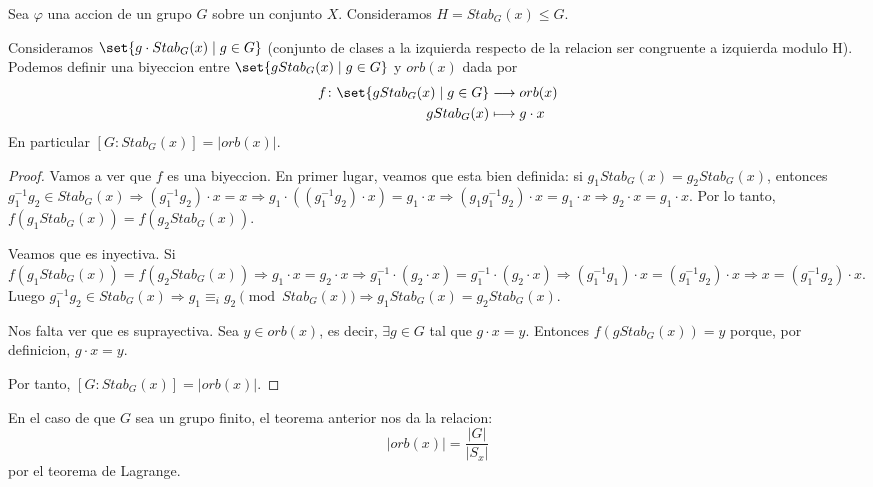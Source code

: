 \begin{theorem}[de la orbita]
	Sea \(\varphi\) una accion de un grupo \(G \) sobre un conjunto \(X \). Consideramos \(H = Stab_{G}(x) \leq G \).
	
	Consideramos \(\set{g \cdot Stab_{G}(x) \mid g \in G }\) (conjunto de clases a la izquierda respecto de la relacion ser congruente a izquierda modulo H). Podemos definir una biyeccion entre \(\set{g  Stab_G(x) \mid g \in G}\) y \(orb(x )\) dada por
	\[
		\begin{aligned}
			f \colon  \set{g Stab_G(x) \mid g \in G} & \longrightarrow   orb(x) \\
			gStab_G(x)                               & \longmapsto g \cdot x
		\end{aligned}
	\]
	En particular \([G:Stab_G(x)] = |orb(x)| \).
	
\end{theorem}
\begin{proof}
	Vamos a ver que \(f \) es una biyeccion. En primer lugar, veamos que esta bien definida: si \(g_1 Stab_G (x) = g_2 Stab_G (x)\), entonces \(g^{-1}_1 g_2 \in Stab_G(x ) \Rightarrow (g^{-1}_1 g_2) \cdot x = x \Rightarrow g_1 \cdot ((g^{-1}_1 g_2) \cdot x) = g_1 \cdot x \Rightarrow (g_1 g^{-1}_1 g_2 ) \cdot x = g_1 \cdot x \Rightarrow g_2 \cdot x = g_1 \cdot x\). Por lo tanto, \(f(g_1 Stab_G(x)) = f(g_2 Stab_G(x ))\).
	
	Veamos que es inyectiva. Si \(f(g_1 Stab_G (x)) = f(g_2 Stab_G (x)) \Rightarrow g_1 \cdot x = g_2 \cdot x \Rightarrow g^{-1}_1 \cdot (g_2 \cdot x) = g^{-1}_1 \cdot (g_2 \cdot x ) \Rightarrow (g^{-1}_1 g_1) \cdot x = (g^{-1}_1 g_2) \cdot x \Rightarrow x = (g^{-1}_1 g_2 ) \cdot x \). Luego \( g^{-1}_1 g_2 \in Stab_G (x) \Rightarrow g_1 \equiv_i g_2 \pmod {Stab_G (x)} \Rightarrow g_1 Stab_G(x) = g_2 Stab_G(x )\).
	
	Nos falta ver que es suprayectiva. Sea \(y \in orb(x )\), es decir, \(\exists g \in G \) tal que \(g \cdot x = y \). Entonces \(f(g Stab_G (x)) = y \) porque, por definicion, \( g \cdot x = y \). 
	
	Por tanto, \([G:Stab_G(x)] = |orb(x)| \). 
\end{proof}
\begin{remark}
	En el caso de que \(G \) sea un grupo finito, el teorema anterior nos da la relacion:
	\[
		|orb(x)| = \frac{|G| }{|S_x| }
	\]
	por el teorema de Lagrange. 
\end{remark}
